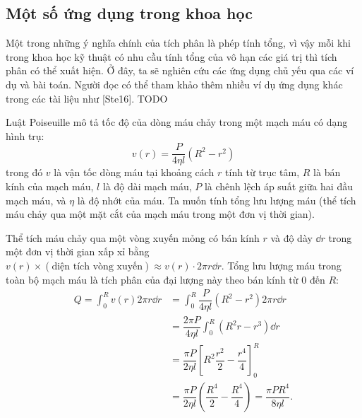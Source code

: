 \subsection{Một số ứng dụng trong khoa học}
Một trong những ý nghĩa chính của tích phân là phép tính tổng, vì vậy mỗi khi trong khoa học kỹ thuật có nhu cầu tính tổng của vô hạn các giá trị thì tích phân có thể xuất hiện. Ở đây, ta sẽ nghiên cứu các ứng dụng chủ yếu qua các ví dụ và bài toán. Người đọc có thể tham khảo thêm nhiều ví dụ ứng dụng khác trong các tài liệu như [Ste16]. TODO

\begin{example}
    Luật Poiseuille mô tả tốc độ của dòng máu chảy trong một mạch máu có dạng hình trụ:
    \[ v(r) = \dfrac{P}{4\eta l}(R^2 - r^2) \]
    trong đó $v$ là vận tốc dòng máu tại khoảng cách $r$ tính từ trục tâm, $R$ là bán kính của mạch máu, $l$ là độ dài mạch máu, $P$ là chênh lệch áp suất giữa hai đầu mạch máu, và $\eta$ là độ nhớt của máu. Ta muốn tính tổng lưu lượng máu (thể tích máu chảy qua một mặt cắt của mạch máu trong một đơn vị thời gian).
    
    Thể tích máu chảy qua một vòng xuyến mỏng có bán kính $r$ và độ dày $\dd r$ trong một đơn vị thời gian xấp xỉ bằng $v(r) \times (\text{diện tích vòng xuyến}) \approx v(r) \cdot 2\pi r \dd r$.
    Tổng lưu lượng máu trong toàn bộ mạch máu là tích phân của đại lượng này theo bán kính từ $0$ đến $R$:
    \begin{align*}
        Q = \int_0^R v(r) 2\pi r \dd r &= \int_0^R \dfrac{P}{4\eta l}(R^2 - r^2) 2\pi r \dd r \\
        &= \dfrac{2\pi P}{4\eta l} \int_0^R (R^2r - r^3) \dd r \\
        &= \dfrac{\pi P}{2\eta l} \left[ R^2\dfrac{r^2}{2} - \dfrac{r^4}{4} \right]_0^R \\
        &= \dfrac{\pi P}{2\eta l} \left( \dfrac{R^4}{2} - \dfrac{R^4}{4} \right) = \dfrac{\pi P R^4}{8\eta l}.
    \end{align*}
\end{example}

